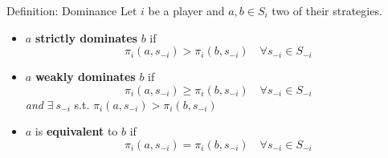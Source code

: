 
\begin{frame}{Definition: Dominance}
Let $i$ be a player and $a,b\in S_i$ two of their strategies.
\bsk
\begin{itemize}
    \item $a$ \textbf{strictly dominates} $b$ if
    $$\pi_i(a,s_{-i})>\pi_i(b,s_{-i}) \quad\forall s_{-i}\in S_{-i}$$
    \bsk
    \item $a$ \textbf{weakly dominates} $b$ if
    $$\pi_i(a,s_{-i})\ge\pi_i(b,s_{-i}) \quad\forall s_{-i}\in S_{-i}$$
    \hspace{1.5in} \textit{and} $\exists\ s_{-i}$ s.t. $\pi_i(a,s_{-i})>\pi_i(b,s_{-i})$
    \bsk
    \item $a$ is \textbf{equivalent} to $b$ if
    $$\pi_i(a,s_{-i})=\pi_i(b,s_{-i}) \quad \forall s_{-i}\in S_{-i}$$
\end{itemize}
\end{frame}

